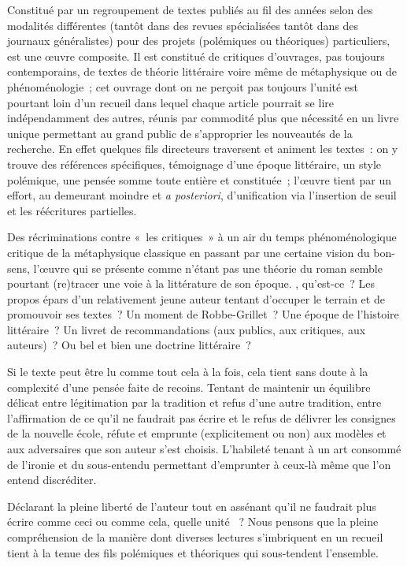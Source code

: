 \documentclass[12pt, a4paper]{article}
\begin{document}

Constitué par un regroupement de textes publiés au fil des années selon des modalités différentes (tantôt dans des revues spécialisées tantôt dans des journaux généralistes) pour des projets (polémiques ou théoriques) particuliers, \punr{} est une œuvre composite. Il est constitué de critiques d'ouvrages, pas toujours contemporains, de textes de théorie littéraire voire même de métaphysique ou de phénoménologie~; cet ouvrage dont on ne perçoit pas toujours l'unité est pourtant loin d'un recueil dans lequel chaque article pourrait se lire indépendamment des autres, réunis par commodité plus que nécessité en un livre unique permettant au grand public de s'approprier les nouveautés de la recherche. En effet quelques fils directeurs traversent et animent les textes~: on y trouve des références spécifiques, témoignage d'une époque littéraire, un style polémique, une pensée somme toute entière et constituée~; l'œuvre tient par un effort, au demeurant moindre et \textit{a posteriori}, d'unification via l'insertion de seuil et les réécritures partielles.

Des récriminations contre «~les critiques~» à un air du temps phénoménologique critique de la métaphysique classique en passant par une certaine vision du bon-sens, l'œuvre qui se présente comme n'étant pas une théorie du roman semble pourtant (re)tracer une voie à la littérature de son époque. \punr, qu'est-ce~? Les propos épars d'un relativement jeune auteur tentant d'occuper le terrain et de promouvoir ses textes~? Un moment de Robbe-Grillet~? Une époque de l'histoire littéraire~? Un livret de recommandations (aux publics, aux critiques, aux auteurs)~? Ou bel et bien une doctrine littéraire~?

Si le texte peut être lu comme tout cela à la fois, cela tient sans doute à la complexité d'une pensée faite de recoins. Tentant de maintenir un équilibre délicat entre légitimation par la tradition et refus d'une autre tradition, entre l'affirmation de ce qu'il ne faudrait pas écrire et le refus de délivrer les consignes de la nouvelle école, \punr{} réfute et emprunte (explicitement ou non) aux modèles et aux adversaires que son auteur s'est choisis. L'habileté tenant à un art consommé de l'ironie et du sous-entendu permettant d'emprunter à ceux-là même que l'on entend discréditer.

Déclarant la pleine liberté de l'auteur tout en assénant qu'il ne faudrait plus écrire comme ceci ou comme cela, quelle unité \punr~? Nous pensons que la pleine compréhension de la manière dont diverses lectures s'imbriquent en un recueil tient à la tenue des fils polémiques et théoriques qui sous-tendent l'ensemble. 
\end{document}
